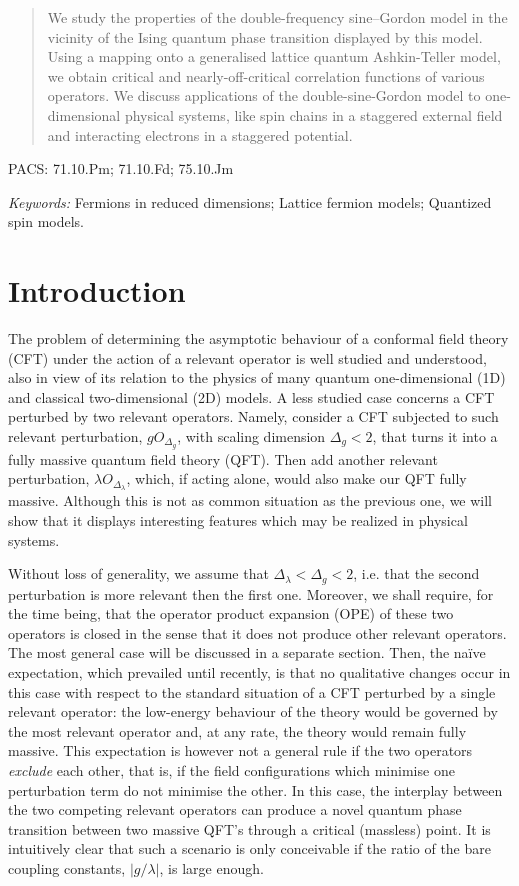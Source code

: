\begin{abstract}

We study the properties of the double-frequency sine--Gordon model 
in the vicinity of the 
Ising quantum phase transition displayed by this model.  
Using a mapping onto a generalised 
lattice quantum Ashkin-Teller model, we obtain critical and
nearly-off-critical correlation functions of various operators.
We discuss applications of the double-sine-Gordon
model to one-dimensional physical systems, like 
spin chains in a staggered external field and interacting
electrons in a staggered potential.
\end{abstract}

\noindent
PACS: 71.10.Pm; 71.10.Fd; 75.10.Jm

\noindent
{\sl Keywords:} Fermions in reduced dimensions; Lattice fermion models;
Quantized spin models.
\section{Introduction}




The problem of determining the asymptotic behaviour of a conformal field 
theory (CFT) under the action of a relevant operator is well studied and 
understood, also in view of its relation to the physics of many 
quantum one-dimensional (1D) and classical two-dimensional (2D) 
models. 
A less studied case concerns a CFT
perturbed by two relevant operators. 
Namely, consider a CFT subjected to such relevant 
perturbation, $g O_{\Delta_g}$, 
with scaling dimension $\Delta_g < 2$,
that turns
it into a fully massive quantum field
theory (QFT).
Then add another relevant perturbation,
$\lambda O_{\Delta_\lambda}$,
which, if acting alone, would also make
our QFT fully massive.
Although this is not as common situation as the previous one, 
we will show that it displays interesting features which 
may be realized in physical systems.

Without loss of generality, we
assume that $\Delta_\lambda<\Delta_g<2$,
i.e. that the second perturbation is more relevant
then the first one. Moreover, 
we shall require, for the time being, that the operator
product expansion (OPE) of these two
operators is closed in the sense that it
does not produce other relevant operators. The most general case 
will be discussed in a separate section. 
Then, the na\"{i}ve expectation, which prevailed until recently,
is that no qualitative changes occur in this case with respect to the 
standard situation of a CFT perturbed by a single relevant operator:
the low-energy behaviour of the theory
would be governed by the most relevant operator
and, at any rate, the theory would remain 
fully massive. 
This expectation is however not a general rule if the 
two operators {\sl exclude} each other, that is, if the 
field configurations which minimise one perturbation term 
do not minimise the other. 
In this case, the interplay between the two competing
relevant operators  
can produce a novel quantum phase transition between two massive QFT's 
through a critical (massless) point. It is intuitively clear that
such a scenario is only conceivable if the ratio of the
bare coupling constants, $|g/\lambda|$, is large enough. 

